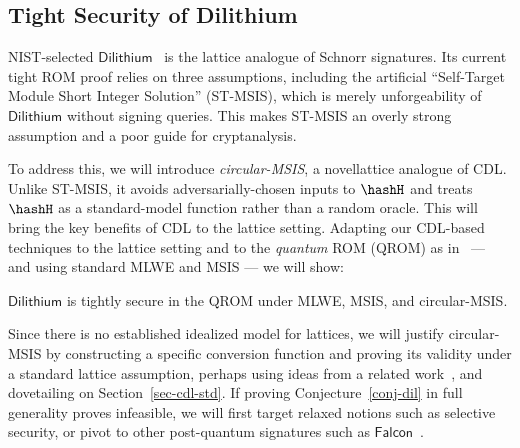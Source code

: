 

\subsection{Tight Security of Dilithium}

NIST-selected $\mathsf{Dilithium}$~\cite{Dilithium} is the lattice analogue of Schnorr signatures. 
Its current tight ROM proof relies on three assumptions, including the artificial 
``Self-Target Module Short Integer Solution'' (ST-MSIS), which is merely unforgeability of 
$\mathsf{Dilithium}$ without signing queries. This makes ST-MSIS an overly strong assumption and a poor guide for cryptanalysis.

To address this, we  will introduce \emph{circular-MSIS}, a  novellattice analogue of CDL. Unlike ST-MSIS, 
it avoids adversarially-chosen inputs to $\hashH$ and treats $\hashH$ as a standard-model 
function rather than a random oracle. This will bring the key benefits of CDL to the lattice setting. 
Adapting our CDL-based techniques to the lattice setting and to the \emph{quantum} ROM (QROM) as in~\cite{Dilithium} --- 
and using standard MLWE and MSIS --- we will show:

\begin{conj} \label{conj-dil}
$\mathsf{Dilithium}$ is tightly secure in the QROM under MLWE, MSIS, and circular-MSIS.
\end{conj}

Since there is no established idealized model for lattices, we will justify circular-MSIS 
by constructing a specific conversion function and proving its validity under a standard 
lattice assumption, perhaps using ideas from a related work~\cite{C:CLMQ21}, and dovetailing on Section~\ref{sec-cdl-std}. 
If proving Conjecture~\ref{conj-dil} in full generality proves infeasible, we will first 
target relaxed notions such as selective security, or pivot to other post-quantum signatures 
such as $\mathsf{Falcon}$~\cite{falcon}.
 
